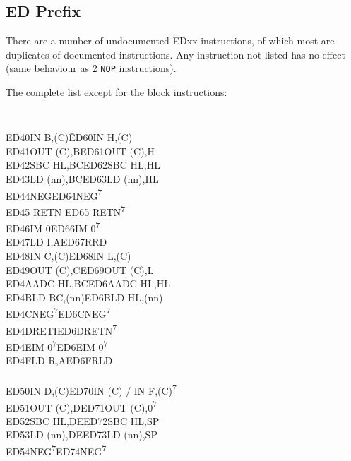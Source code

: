 \documentclass[twoside,openright,a4paper]{book}
\newcommand{\See}[1]{\textsuperscript{#1}}
\begin{document}
\subsection{ED Prefix \cite{gerton}}

There are a number of undocumented EDxx instructions, of which most are duplicates of documented instructions. Any instruction not listed has no effect (same behaviour as 2 {\tt NOP} instructions).

The complete list except for the block instructions:

\renewcommand{\thefootnote}{\fnsymbol{footnote}}
{}
{\tt 
	\begin{tabbing}
		{\qquad}ED40\quad\=IN B,(C)\qquad\qquad\=ED60\quad\=IN H,(C)\\ 
		{\qquad}ED41\>OUT (C),B\>ED61\>OUT (C),H\\ 
		{\qquad}ED42\>SBC HL,BC\>ED62\>SBC HL,HL\\  
		{\qquad}ED43\>LD (nn),BC\>ED63\>LD (nn),HL\\ 
		{\qquad}ED44\>NEG\>ED64\>NEG{\See{7}}\\ 
		{\qquad}ED45 \> RETN\> ED65\> RETN{\See{7}}\\
		{\qquad}ED46\>IM 0\>ED66\>IM 0{\See{7}}\\
		{\qquad}ED47\>LD I,A\>ED67\>RRD\\
		{\qquad}ED48\>IN C,(C)\>ED68\>IN L,(C)\\
		{\qquad}ED49\>OUT (C),C\>ED69\>OUT (C),L\\
		{\qquad}ED4A\>ADC HL,BC\>ED6A\>ADC HL,HL\\
		{\qquad}ED4B\>LD BC,(nn)\>ED6B\>LD HL,(nn)\\
		{\qquad}ED4C\>NEG{\See{7}}\>ED6C\>NEG{\See{7}}\\
		{\qquad}ED4D\>RETI\>ED6D\>RETN\See{7}\\
		{\qquad}ED4E\>IM 0{\See{7}}\>ED6E\>IM 0{\See{7}}\\
		{\qquad}ED4F\>LD R,A\>ED6F\>RLD\\
		{\qquad}\\
		{\qquad}ED50\>IN D,(C)\>ED70\>IN (C) / IN F,(C){\See{7}}\\
		{\qquad}ED51\>OUT (C),D\>ED71\>OUT (C),0{\See{7}}\\
		{\qquad}ED52\>SBC HL,DE\>ED72\>SBC HL,SP\\
		{\qquad}ED53\>LD (nn),DE\>ED73\>LD (nn),SP\\
		{\qquad}ED54\>NEG{\See{7}}\>ED74\>NEG{\See{7}}\\

\end{tabbing}}
\end{document}
